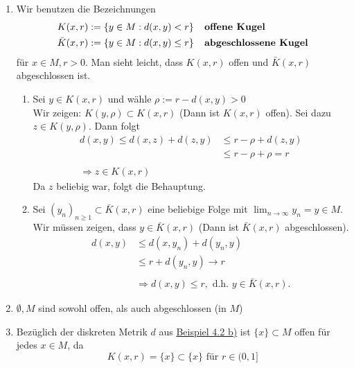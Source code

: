 \begin{bemerkung} \label{bem:1-4.5}
	\begin{enumerate}[label=\alph*\upshape)] 
		\item Wir benutzen die Bezeichnungen
			\begin{align*}
				K(x, r) & := \{ y \in M: d(x, y) < r \} \hspace{0.25cm} \text{\textbf{ offene Kugel}} \\
				\bar K(x, r) & := \{ y \in M: d(x, y) \leq r \} \hspace{0.25cm}  \text{\textbf{ abgeschlossene Kugel}}
			\end{align*}
			für $x \in M, r > 0$. Man sieht leicht, dass $K(x, r)$ offen und $\bar K(x, r)$ abgeschlossen ist.
		\begin{beweis}
			\begin{enumerate}
			\item Sei $y \in K(x, r)$ und wähle $\rho := r - d(x, y) > 0$ \\
				Wir zeigen: $K(y, \rho) \subset K(x, r)$ (Dann ist $K(x, r)$ offen). Sei dazu $z \in K(y, \rho)$. Dann folgt 
				\begin{align*}
					d(x, y) \leq d(x, z) + d(z,y) & \leq r - \rho + d(z, y) \\
												  & \leq r - \rho + \rho = r \\ \\
								\Rightarrow z \in K(x, r)
				\end{align*} 
				Da $z$ beliebig war, folgt die Behauptung.
			\item Sei $(y_{n})_{n \geq 1} \subset \bar K(x, r)$ eine beliebige Folge mit $ \lim_{n \rightarrow \infty} y_{n} = y \in M$. Wir müssen zeigen, dass $y \in \bar K(x, r)$ (Dann ist $\bar K(x, r)$ abgeschlossen). \\
				\begin{align*}
					d(x, y) & \leq d(x, y_{n}) + d(y_{n}, y) \\
							& \leq r + d(y_{n}, y) \rightarrow r \\ \\
						& \Rightarrow d(x, y) \leq r, \text{ d.h. } y \in \bar K(x, r).
				\end{align*} 
			\end{enumerate}	
		\end{beweis} 
		\item $\emptyset, M$ sind sowohl offen, als auch abgeschlossen (in $M$)
		\item Bezüglich der diskreten Metrik $d$ aus \hyperref[bsp:1-diskreteMetrik]{Beispiel 4.2 b)} ist $\{x\} \subset M$ offen für jedes $x \in M$, da
			\[ K(x, r) = \{ x \} \subset \{ x \} \text{ für } r \in (0, 1] \]
	\end{enumerate}	
\end{bemerkung}

